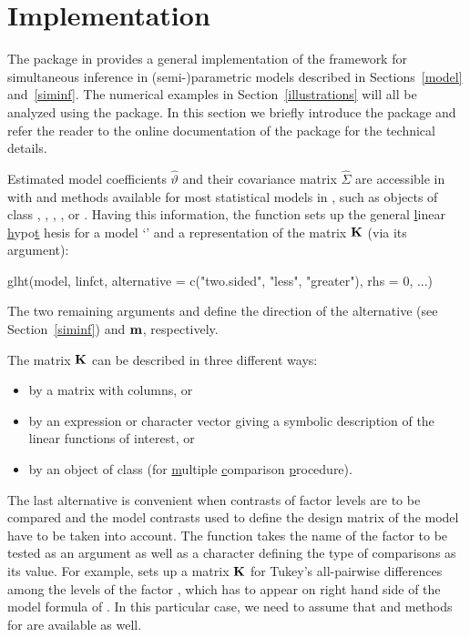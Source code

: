 \documentclass[12pt]{article}
\begin{document}
\section{Implementation}

\label{implementation}

The  package \citep{pkg:multcomp} in \RR{} \citep{R2007}
provides a general implementation of the framework for simultaneous
inference in (semi-)\-parametric models described in Sections~\ref{model}
and~\ref{siminf}. The numerical examples in Section~\ref{illustrations} will
all be analyzed using the  package. In this section we
briefly introduce the  package and refer the reader to
the online documentation of the package for the technical details.

Estimated model coefficients $\hat{\vartheta}$ and their covariance matrix $%
\hat{\Sigma}$ are accessible in \RR{} with  and 
methods available for most statistical models in \RR, such as objects of
class , , , , or %
. Having this information, the  function sets
up the \underline{g}eneral \underline{l}inear \underline{h}ypo\underline{t}%
hesis for a model `' and a representation of the matrix $\mathbf{K}$
(via its  argument): 
\begin{Sinput}
glht(model, linfct, alternative = c("two.sided", "less", "greater"),
     rhs = 0, ...)
\end{Sinput}
The two remaining arguments  and  define the
direction of the alternative (see Section~\ref{siminf}) and $\mathbf{m}$,
respectively.

The matrix $\mathbf{K}$ can be described in three different ways:

\begin{itemize}
\item by a matrix with  columns, or

\item by an expression or character vector giving a symbolic description  of
the linear functions of interest, or

\item by an object of class   (for \underline{m}ultiple 
\underline{c}omparison \underline{p}rocedure).
\end{itemize}

The last alternative is convenient when contrasts of factor levels are to be
compared and the model contrasts used to define the design matrix of the
model have to be taken into account. The  function takes the
name of the factor to be tested as an argument as well as a character
defining the type of comparisons as its value. For example,  sets up a matrix $\mathbf{K}$ for Tukey's all-pairwise differences among
the levels of the factor , which has to appear on right hand
side of the model formula of . In this particular case, we
need to assume that  and  methods
for  are available as well.
\end{document}
